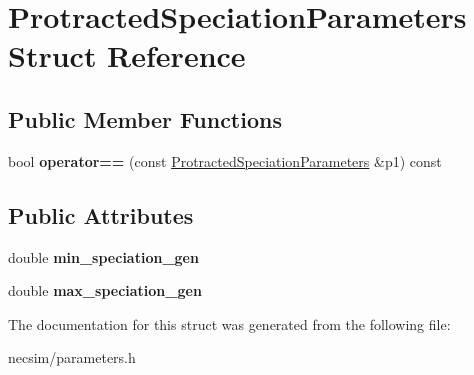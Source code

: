 \hypertarget{struct_protracted_speciation_parameters}{}\section{Protracted\+Speciation\+Parameters Struct Reference}
\label{struct_protracted_speciation_parameters}
\subsection*{Public Member Functions}
\begin{DoxyCompactItemize}
\item 
bool {\bfseries operator==} (const \hyperlink{struct_protracted_speciation_parameters}{Protracted\+Speciation\+Parameters} \&p1) const \hypertarget{struct_protracted_speciation_parameters_abe159fbe34c12a6db9bff5b9fc4edb00}{}\label{struct_protracted_speciation_parameters_abe159fbe34c12a6db9bff5b9fc4edb00}

\end{DoxyCompactItemize}
\subsection*{Public Attributes}
\begin{DoxyCompactItemize}
\item 
double {\bfseries min\+\_\+speciation\+\_\+gen}\hypertarget{struct_protracted_speciation_parameters_a3e2e07443b576ee10b70fc153f772b6c}{}\label{struct_protracted_speciation_parameters_a3e2e07443b576ee10b70fc153f772b6c}

\item 
double {\bfseries max\+\_\+speciation\+\_\+gen}\hypertarget{struct_protracted_speciation_parameters_a79cc8e49ed9a08044718485040ff4346}{}\label{struct_protracted_speciation_parameters_a79cc8e49ed9a08044718485040ff4346}

\end{DoxyCompactItemize}


The documentation for this struct was generated from the following file\+:\begin{DoxyCompactItemize}
\item 
necsim/parameters.\+h\end{DoxyCompactItemize}
